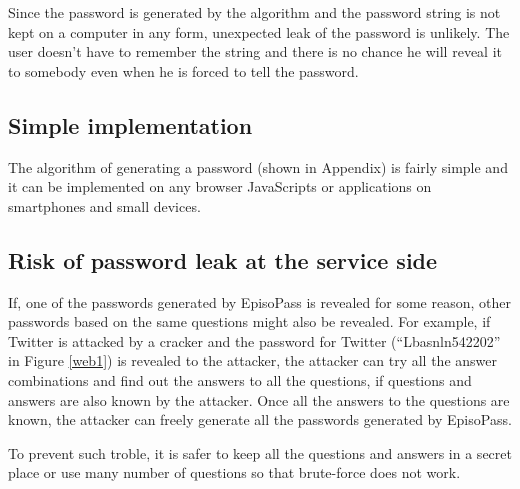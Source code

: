 \documentclass{sigchi}
\begin{document}
Since the password is generated by the algorithm and the password
string is not kept on a computer in any form,
unexpected leak of the password is unlikely.
The user doesn't have to remember the string and
there is no chance he will reveal it to somebody
even when he is forced to tell the password.


\subsection{Simple implementation}

The algorithm of generating a password (shown in Appendix)
is fairly simple and
it can be implemented on any browser JavaScripts or
applications on smartphones and small devices.

\subsection{Risk of password leak at the service side}

If, one of the passwords generated by EpisoPass is revealed
for some reason, other passwords based on the same questions
might also be revealed.
%
For example, if Twitter is attacked by a cracker and
the password for Twitter (``\textsf{Lbasnln542202}'' in Figure \ref{web1})
is revealed to the attacker,
the attacker can try all the answer combinations and find out
the answers to all the questions,
if questions and answers are also known by the attacker.
Once all the answers to the questions are known,
the attacker can freely generate all the passwords
generated by EpisoPass.

To prevent such troble, it is safer to keep all the questions and answers
in a secret place or
use many number of questions so that brute-force does not work.

% 
%
\end{document}
